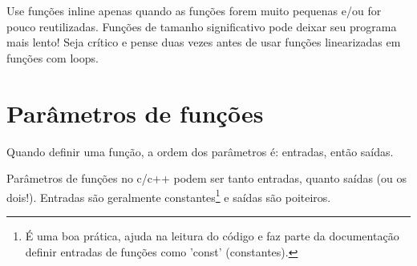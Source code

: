\documentclass{article}
\begin{document}
Use funções inline apenas quando as funções forem muito pequenas e/ou for pouco reutilizadas. Funções de tamanho significativo pode deixar seu programa mais lento! Seja crítico e pense duas vezes antes de usar funções linearizadas em funções com loops.

\section{Parâmetros de funções}

Quando definir uma função, a ordem dos parâmetros é: entradas, então saídas.

Parâmetros de funções no c/c++ podem ser tanto entradas, quanto saídas (ou os dois!). Entradas são geralmente constantes\footnote{É uma boa prática, ajuda na leitura do código e faz parte da documentação definir entradas de funções como 'const' (constantes).} e saídas são poiteiros. 
\end{document}
